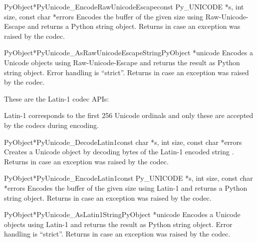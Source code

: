 \documentclass{manual}
\begin{document}
\begin{cfuncdesc}{PyObject*}{PyUnicode_EncodeRawUnicodeEscape}{const Py_UNICODE *s,
                                               int size,
                                               const char *errors}
Encodes the  buffer of the given size using Raw-Unicode-Escape
and returns a Python string object.  Returns \NULL{} in case an
exception was raised by the codec.
\end{cfuncdesc}

\begin{cfuncdesc}{PyObject*}{PyUnicode_AsRawUnicodeEscapeString}{PyObject *unicode}
Encodes a Unicode objects using Raw-Unicode-Escape and returns the result
as Python string object. Error handling is ``strict''. Returns
\NULL{} in case an exception was raised by the codec.
\end{cfuncdesc}


These are the Latin-1 codec APIs:

Latin-1 corresponds to the first 256 Unicode ordinals and only these
are accepted by the codecs during encoding.

\begin{cfuncdesc}{PyObject*}{PyUnicode_DecodeLatin1}{const char *s,
                                                     int size,
                                                     const char *errors}
Creates a Unicode object by decoding  bytes of the Latin-1
encoded string . Returns \NULL{} in case an exception was
raised by the codec.
\end{cfuncdesc}

\begin{cfuncdesc}{PyObject*}{PyUnicode_EncodeLatin1}{const Py_UNICODE *s,
                                                     int size,
                                                     const char *errors}
Encodes the  buffer of the given size using Latin-1
and returns a Python string object.  Returns \NULL{} in case an
exception was raised by the codec.
\end{cfuncdesc}

\begin{cfuncdesc}{PyObject*}{PyUnicode_AsLatin1String}{PyObject *unicode}
Encodes a Unicode objects using Latin-1 and returns the result as
Python string object. Error handling is ``strict''. Returns
\NULL{} in case an exception was raised by the codec.
\end{cfuncdesc}
\end{document}
